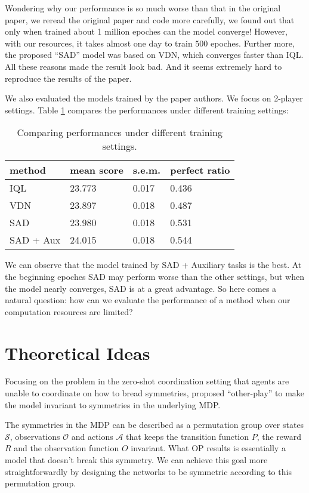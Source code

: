 \documentclass[12pt]{article}
\begin{document}
Wondering why our performance is so much worse than that in the original paper, we reread the original paper and code more carefully, we found out that only when trained about 1 million epoches can the model converge! However, with our resources, it takes almost one day to train $500$ epoches. Further more, the proposed ``SAD'' model was based on VDN, which converges faster than IQL. All these reasons made the result look bad. And it seems extremely hard to reproduce the results of the paper.

We also evaluated the models trained by the paper authors\citep{hu2020simplified}. We focus on 2-player settings. Table \ref{Tab2} compares the performances under different training settings:
\begin{table}[H]
\begin{centering}
\begin{tabular}{|l|l|l|l|}
\hline
method & mean score & s.e.m. & perfect ratio \\ \hline
IQL & 23.773 & 0.017 & 0.436 \\ \hline
VDN & 23.897 & 0.018 & 0.487 \\ \hline
SAD & 23.980 & 0.018 & 0.531 \\ \hline
SAD + Aux & 24.015 & 0.018 & 0.544 \\ \hline
\end{tabular}
\caption{Comparing performances under different training settings.}
\label{Tab2}
\end{centering}
\end{table}

We can observe that the model trained by SAD + Auxiliary tasks is the best. At the beginning epoches SAD may perform worse than the other settings, but when the model nearly converges, SAD is at a great advantage. So here comes a natural question: how can we evaluate the performance of a method when our computation resources are limited?

\section{Theoretical Ideas}
\renewcommand\S{{\mathcal S}}
\renewcommand\O{{\mathcal O}}
\newcommand\A{{\mathcal A}}

  Focusing on the problem in the zero-shot coordination setting that agents are unable to coordinate on how to bread symmetries, \cite{hu2020other} proposed ``other-play'' to make the model invariant to symmetries in the underlying MDP.

  The symmetries in the MDP can be described as a permutation group over states $\S$, observations $\O$ and actions $\A$ that keeps the transition function $P$, the reward $R$ and the observation function $O$ invariant. What OP results is essentially a model that doesn't break this symmetry. We can achieve this goal more straightforwardly by designing the networks to be symmetric according to this permutation group.
\end{document}
